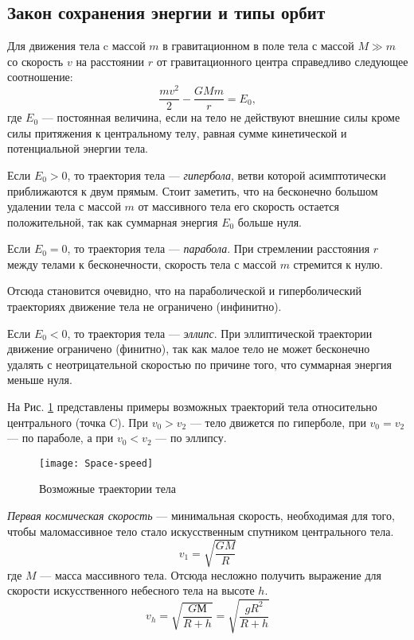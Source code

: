 \subsection{Закон сохранения энергии и типы орбит}
Для движения тела c массой $m$ в гравитационном  в поле тела 
с массой \linebreak $M\gg m$ со скорость $v$ на расстоянии $r$ от 
гравитационного центра справедливо следующее соотношение: 
\begin{equation}
\frac{m v^2}{2}-\frac{GM m }{r}=E_0,
\end{equation}
где $E_0$ --- постоянная величина, если на тело не действуют
внешние силы кроме силы притяжения к центральному телу, 
равная сумме кинетической и потенциальной энергии тела.

Если $E_0>0$, то траектория тела --- {\itshape гипербола}, 
ветви которой асимптотически приближаются к двум прямым. Стоит заметить,
что на бесконечно большом удалении тела с массой $m$ от массивного тела
его скорость остается положительной, так как суммарная энергия $E_0$ 
больше нуля.

Если $E_0=0$, то траектория тела --- {\itshape парабола}. При стремлении
расстояния $r$ между телами к бесконечности, скорость тела с массой $m$ 
стремится к нулю.

Отсюда становится очевидно, что на параболической и гиперболический
 траекториях движение тела не ограничено (инфинитно). 

Если $E_0<0$, то траектория тела --- {\itshape эллипс}. При 
эллиптической траектории движение ограничено (финитно), так как малое тело
не может бесконечно удалять с неотрицательной скоростью по причине того,
что суммарная энергия меньше нуля.



На Рис. \ref{pic:orbits} представлены примеры возможных траекторий тела 
относительно центрального (точка C). При $v_0 > v_{2}$ --- тело движется 
по гиперболе, при $v_0 = v_{2}$ --- по параболе, 
а при $v_0 < v_{2}$ --- по эллипсу.\\

\begin{figure}[h!]
\centering
\texttt{[image: Space-speed]}
\caption{Возможные траектории тела \label{pic:orbits}}
\end{figure}

\textit{Первая космическая скорость} --- минимальная скорость, необходимая для того, чтобы маломассивное тело стало искусственным спутником центрального тела.
\begin{equation}v_1=\sqrt{\frac{GM}{R}}
\end{equation}
где $M$ --- масса массивного тела. Отсюда несложно получить выражение для
скорости искусственного небесного тела на высоте $h$.\begin{equation}v_h=\sqrt{\frac{GМ}{R+h}}=\sqrt{\frac{gR^2}{R+h}}
\end{equation}\\

